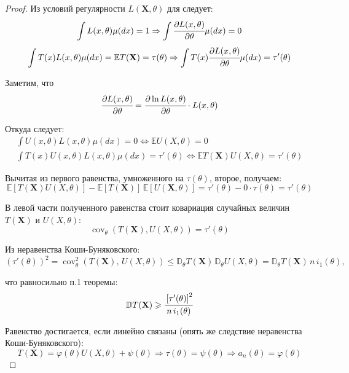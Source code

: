 \begin{proof}
Из условий регулярности $L(\mathbf{X}, \theta)$ для следует:
$$\int L(x, \theta) \mu(d x)=1 \Rightarrow \int \cfrac{\partial L(x, \theta)}{\partial \theta} \mu(d x)=0$$
\begin{equation*}
    \int T(x) L(x, \theta) \mu(d x)=\mathbb{E} T(\mathbf{X})=\tau(\theta) \Rightarrow \int T(x) \cfrac{\partial L(x, \theta)}{\partial \theta} \mu(d x)=\tau'(\theta)
\end{equation*}

Заметим, что
\begin{equation*}
    \cfrac{\partial L(x, \theta)}{\partial \theta}=\cfrac{\partial \ln L(x, \theta)}{\partial \theta} \cdot L(x, \theta)
\end{equation*}

Откуда следует:
\begin{gather*}
    \int U(x, \theta) L(x, \theta) \mu(d x)=0 \Leftrightarrow \mathbb{E} U(X, \theta)=0 \\
\int T(x) U(x, \theta) L(x, \theta) \mu(d x)=\tau'(\theta) \Leftrightarrow \mathbb{E} T(\mathbf{X}) U(X, \theta)=\tau'(\theta)
\end{gather*}

Вычитая из первого равенства, умноженного на $\tau(\theta)$, второе, получаем:
\begin{equation*}
    \mathbb{E}\left[T(\mathbf{X}) U(X, \theta)\right] - \mathbb{E}\left[T(\mathbf{X})\right] \, \mathbb{E}\left[U(\mathbf{X}, \theta)\right] = \tau'(\theta) - 0 \cdot \tau(\theta) = \tau'(\theta)
\end{equation*}

В левой части полученного равенства стоит ковариация случайных величин $T(\mathbf{X})$ и $U(X,\theta)$:
\begin{equation*}
    \operatorname{cov}_{\theta}(T(\mathbf{X}), U(X, \theta))=\tau'(\theta)
\end{equation*}

Из неравенства Коши-Буняковского:
\begin{equation*}
    \left(\tau'(\theta)\right)^{2}=\operatorname{cov}_{\theta}^{2}(T(\mathbf{X}), \, U(X, \theta)) \leqslant \mathbb{D}_{\theta} T(\mathbf{X}) \,\mathbb{D}_{\theta} U(X, \theta)=\mathbb{D}_{\theta} T(\mathbf{X}) \, 
    n \, i_1(\theta),
\end{equation*}

что равносильно п.1 теоремы:
\begin{equation*}
    \mathbb{D} T(\mathbf{X}) \geqslant \cfrac{\left[\tau'(\theta)\right]^{2}}
    {n \, i_1(\theta)}
\end{equation*}

Равенство достигается, если линейно связаны (опять же следствие неравенства Коши-Буняковского):
\begin{equation*}
    T(\mathbf{X})=\varphi(\theta) U(X, \theta)+\psi(\theta) \Rightarrow \tau(\theta)=\psi(\theta) \Rightarrow a_{n}(\theta)=\varphi(\theta)
\end{equation*}

\end{proof}

